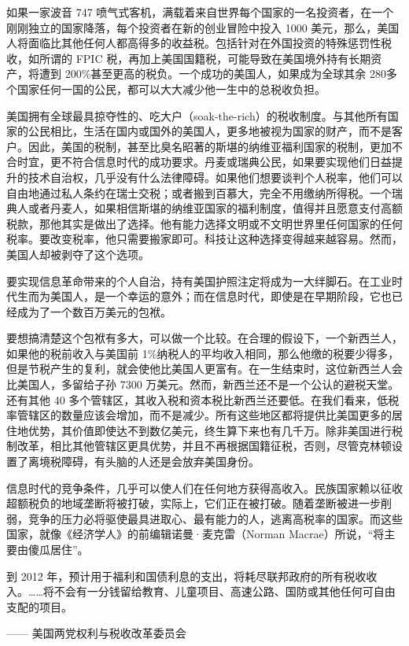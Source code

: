 如果一家波音 747 喷气式客机，满载着来自世界每个国家的一名投资者，在一个刚刚独立的国家降落，每个投资者在新的创业冒险中投入 1000 美元，那么，美国人将面临比其他任何人都高得多的收益税。包括针对在外国投资的特殊惩罚性税收，如所谓的 FPIC 税，再加上美国国籍税，可能导致在美国境外持有长期资产，将遭到 200\%甚至更高的税负。一个成功的美国人，如果成为全球其余 280多个国家任何一国的公民，都可以大大减少他一生中的总税收负担。

美国拥有全球最具掠夺性的、吃大户（soak-the-rich）的税收制度。与其他所有国家的公民相比，生活在国内或国外的美国人，更多地被视为国家的财产，而不是客户。因此，美国的税制，甚至比臭名昭著的斯堪的纳维亚福利国家的税制，更加不合时宜，更不符合信息时代的成功要求。丹麦或瑞典公民，如果要实现他们日益提升的技术自治权，几乎没有什么法律障碍。如果他们想要谈判个人税率，他们可以自由地通过私人条约在瑞士交税；或者搬到百慕大，完全不用缴纳所得税。一个瑞典人或者丹麦人，如果相信斯堪的纳维亚国家的福利制度，值得并且愿意支付高额税款，那他其实是做出了选择。他有能力选择文明或不文明世界里任何国家的任何税率。要改变税率，他只需要搬家即可。科技让这种选择变得越来越容易。然而，美国人却被剥夺了这个选项。

要实现信息革命带来的个人自治，持有美国护照注定将成为一大绊脚石。在工业时代生而为美国人，是一个幸运的意外；而在信息时代，即使是在早期阶段，它也已经成为了一个数百万美元的包袱。

要想搞清楚这个包袱有多大，可以做一个比较。在合理的假设下，一个新西兰人，如果他的税前收入与美国前 1\%纳税人的平均收入相同，那么他缴的税要少得多，但是节税产生的复利，就会使他比美国人更富有。在一生结束时，这位新西兰人会比美国人，多留给子孙 7300 万美元。然而，新西兰还不是一个公认的避税天堂。还有其他 40 多个管辖区，其收入税和资本税比新西兰还要低。在我们看来，低税率管辖区的数量应该会增加，而不是减少。所有这些地区都将提供比美国更多的居住地优势，其价值即使达不到数亿美元，终生算下来也有几千万。除非美国进行税制改革，相比其他管辖区更具优势，并且不再根据国籍征税，否则，尽管克林顿设置了离境税障碍，有头脑的人还是会放弃美国身份。

信息时代的竞争条件，几乎可以使人们在任何地方获得高收入。民族国家赖以征收超额税负的地域垄断将被打破，实际上，它们正在被打破。随着垄断被进一步削弱，竞争的压力必将驱使最具进取心、最有能力的人，逃离高税率的国家。而这些国家，就像《经济学人》的前编辑诺曼·麦克雷（Norman Macrae）所说，“将主要由傻瓜居住”。

\begin{tcolorbox}
到 2012 年，预计用于福利和国债利息的支出，将耗尽联邦政府的所有税收收入。……将不会有一分钱留给教育、儿童项目、高速公路、国防或其他任何可自由支配的项目。
\begin{flushright}
—— 美国两党权利与税收改革委员会
\end{flushright}
\end{tcolorbox}


